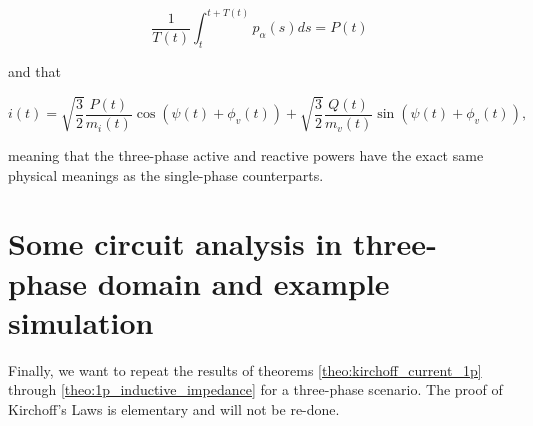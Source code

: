 \begin{equation} \dfrac{1}{T(t)}\int_{t}^{t+T(t)} p_\alpha(s)ds = P(t) \end{equation}

	\noindent and that

\begin{equation} i(t) = \sqrt{\dfrac{3}{2}}\dfrac{P(t)}{m_i(t)}\cos\left(\psi(t) + \phi_v(t)\right) + \sqrt{\dfrac{3}{2}}\dfrac{Q(t)}{m_v(t)}\sin\left(\psi(t) + \phi_v(t)\right) ,\end{equation}

	\noindent meaning that the three-phase active and reactive powers have the exact same physical meanings as the single-phase counterparts.

\section{Some circuit analysis in three-phase domain and example simulation} %

	Finally, we want to repeat the results of theorems \ref{theo:kirchoff_current_1p} through \ref{theo:1p_inductive_impedance} for a three-phase scenario. The proof of Kirchoff's Laws is elementary and will not be re-done.


